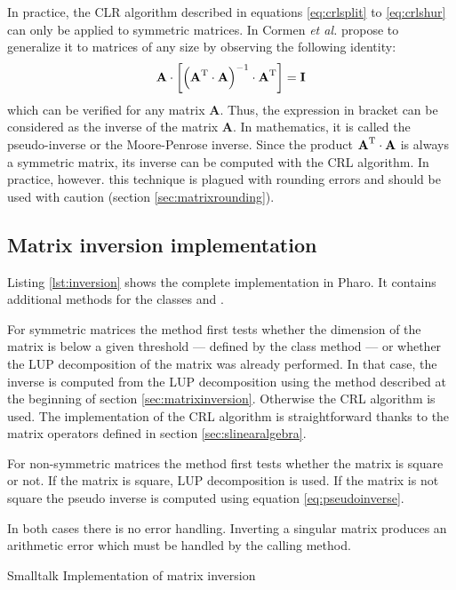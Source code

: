 In practice, the CLR algorithm described in equations
\ref{eq:crlsplit} to \ref{eq:crlshur} can only be applied to
symmetric matrices. In \cite{CorLeiRiv} Cormen \textit{et al.}
propose to generalize it to matrices of any size by observing the
following identity:
\begin{equation}
\label{eq:pseudoinverse}
  \textbf{A}\cdot\left[\left(\textbf{A}^{\mathop\textrm{T}}\cdot\textbf{A}\right)^{-1}\cdot\textbf{A}^{\mathop\textrm{T}}\right]=\textbf{I}
\end{equation}
which can be verified for any matrix $\textbf{A}$. Thus, the
expression in bracket can be considered as the inverse of the
matrix $\textbf{A}$. In mathematics, it is called the pseudo-inverse
or the Moore-Penrose inverse. Since the product
$\textbf{A}^{\mathop\textrm{T}}\cdot\textbf{A}$ is always a symmetric matrix, its
inverse can be computed with the CRL algorithm. In practice,
however. this technique is plagued with rounding errors and should
be used with caution (\cf section \ref{sec:matrixrounding}).

\subsection{Matrix inversion implementation}
Listing \ref{lst:inversion} shows the complete implementation in
Pharo. It contains additional methods for the classes  and .

For symmetric matrices the method  first tests
whether the dimension of the matrix is below a given threshold ---
defined by the class method  --- or
whether the LUP decomposition of the matrix was already performed.
In that case, the inverse is computed from the LUP decomposition
using the method described at the beginning of section
\ref{sec:matrixinversion}. Otherwise the CRL algorithm is used.
The implementation of the CRL algorithm is straightforward thanks
to the matrix operators defined in section
\ref{sec:slinearalgebra}.

For non-symmetric matrices the method  first tests
whether the matrix is square or not. If the matrix is square, LUP
decomposition is used. If the matrix is not square the pseudo
inverse is computed using equation \ref{eq:pseudoinverse}.

In both cases there is no error handling. Inverting a singular
matrix produces an arithmetic error which must be handled by the
calling method.

\begin{listing}[label=lst:inversion]{Smalltalk}
{Implementation of matrix inversion}
\end{listing}

